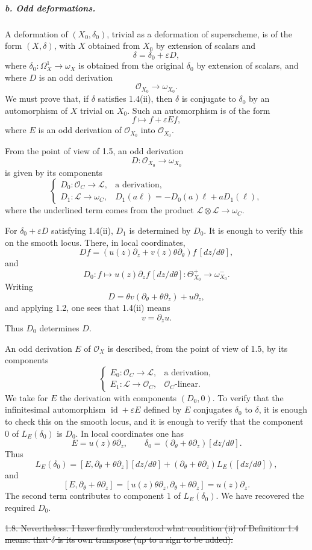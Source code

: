 \documentclass[11pt]{article}
\newcommand{\cO}{\mathcal O}
\newcommand{\cL}{\mathcal L}
\begin{document}
\subparagraph{b. Odd deformations.}
A deformation of $(X_0,\delta_0)$, trivial as a deformation of superscheme, is of the form $(X,\delta)$, with $X$ obtained from $X_0$ by extension of scalars and
\[
  \delta=\delta_0+\varepsilon D,
\]
where $\delta_0:\Omega^1_X\to\omega_X$ is obtained from the original $\delta_0$ by extension of scalars, and where $D$ is an odd derivation
\[
  \cO_{X_0}\longrightarrow\omega_{X_0}.
\]
We must prove that, if $\delta$ satisfies 1.4(ii), then $\delta$ is conjugate to $\delta_0$ by an automorphism of $X$ trivial on $X_0$. Such an automorphism is of the form
\[
  f\longmapsto f+\varepsilon Ef,
\]
where $E$ is an odd derivation of $\cO_{X_0}$ into $\cO_{X_0}$.

From the point of view of 1.5, an odd derivation
\[
  D:\cO_{X_0}\longrightarrow\omega_{X_0}
\]
is given by its components
\[
\begin{cases}
D_0:\cO_C\longrightarrow\cL, & \text{a derivation},\\
D_1:\cL\longrightarrow\omega_C, & D_1(a\ell)=-D_0(a)\ell+aD_1(\ell),
\end{cases}
\]
where the underlined term comes from the product $\cL\otimes\cL\to\omega_C$.

For $\delta_0+\varepsilon D$ satisfying 1.4(ii), $D_1$ is determined by $D_0$. It is enough to verify this on the smooth locus. There, in local coordinates,
\[
  Df=(u(z)\partial_z+v(z)\theta\partial_\theta)f\,[dz/d\theta],
\]
and
\[
  D_0:f\longmapsto u(z)\partial_z f\,[dz/d\theta]:\Theta_{X_0}^+\to\omega_{X_0}^-.
\]
Writing
\[
  D=\theta v(\partial_\theta+\theta\partial_z)+u\partial_z,
\]
and applying 1.2, one sees that 1.4(ii) means
\[
  v=\partial_z u.
\]
Thus $D_0$ determines $D$.

An odd derivation $E$ of $\cO_X$ is described, from the point of view of 1.5, by its components
\[
\begin{cases}
E_0:\cO_C\longrightarrow\cL, & \text{a derivation},\\
E_1:\cL\longrightarrow\cO_C, & \text{$\cO_C$-linear}.
\end{cases}
\]
We take for $E$ the derivation with components $(D_0,0)$. To verify that the infinitesimal automorphism $\operatorname{id}+\varepsilon E$ defined by $E$ conjugates $\delta_0$ to $\delta$, it is enough to check this on the smooth locus, and it is enough to verify that the component $0$ of $L_E(\delta_0)$ is $D_0$. In local coordinates one has
\[
  E=u(z)\theta\partial_z,
  \qquad
  \delta_0=(\partial_\theta+\theta\partial_z)[dz/d\theta].
\]
Thus
\[
  L_E(\delta_0)= [E,\partial_\theta+\theta\partial_z][dz/d\theta]
    +(\partial_\theta+\theta\partial_z)L_E([dz/d\theta]),
\]
and
\[
  [E,\partial_\theta+\theta\partial_z]
   =[u(z)\theta\partial_z,\partial_\theta+\theta\partial_z]
   =u(z)\partial_z.
\]
The second term contributes to component $1$ of $L_E(\delta_0)$. We have recovered the required $D_0$.


\sout{1.8. Nevertheless. I have finally understood what condition \textup{(ii)} of Definition \textup{1.4} means: that $\delta$ is its own transpose (up to a sign to be added).}
\end{document}
